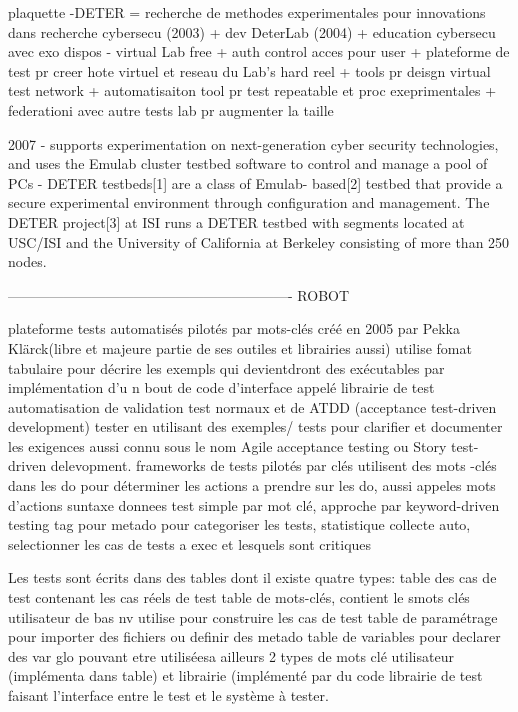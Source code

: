 plaquette
-DETER = recherche de methodes experimentales pour innovations dans recherche cybersecu (2003) + dev DeterLab (2004) + education cybersecu avec exo dispos
- virtual Lab free + auth control acces pour user + plateforme de test pr creer hote virtuel et reseau du Lab's hard reel + tools pr deisgn  virtual test network + automatisaiton tool pr test repeatable et proc exeprimentales + federationi avec autre tests lab pr augmenter la taille

2007
- supports experimentation on next-generation cyber security technologies, and
uses the Emulab cluster testbed software to control and manage a pool of PCs
- DETER testbeds[1] are a class of Emulab- based[2] testbed that provide a
secure experimental environment through configuration and management.  The DETER
project[3] at ISI runs a DETER testbed with segments located at USC/ISI and the
University of California at Berkeley consisting of more than 250 nodes.


-------------------------------------------------------------
ROBOT

plateforme tests automatisés pilotés par mots-clés créé en 2005 par Pekka Klärck(libre et majeure partie de ses outiles et librairies aussi)
utilise fomat tabulaire pour décrire les exempls qui devientdront des exécutables par implémentation d'u n  bout de code d'interface appelé librairie de test
automatisation de validation test normaux et de ATDD (acceptance test-driven development)
tester en utilisant des exemples/ tests pour clarifier et documenter les exigences aussi connu sous le nom Agile acceptance testing ou Story test-driven delevopment.
frameworks de tests pilotés par clés utilisent des mots -clés dans les do pour déterminer les actions a prendre sur les do, aussi appeles mots d'actions
suntaxe donnees test simple par mot clé,  approche par keyword-driven testing
tag pour metado pour categoriser les tests, statistique collecte auto, selectionner les cas de tests a exec et lesquels sont critiques

Les tests sont écrits dans des tables dont il existe quatre types:
table des cas de test contenant les cas réels de test
table de mots-clés, contient le smots clés utilisateur de bas nv utilise pour construire les cas de test
table de paramétrage pour importer des fichiers ou definir des metado
table de variables pour declarer des var glo pouvant etre utiliséesa ailleurs
2 types de mots clé utilisateur (implémenta dans table) et librairie (implémenté par du code librairie de test faisant l'interface entre le test et le système à tester.

